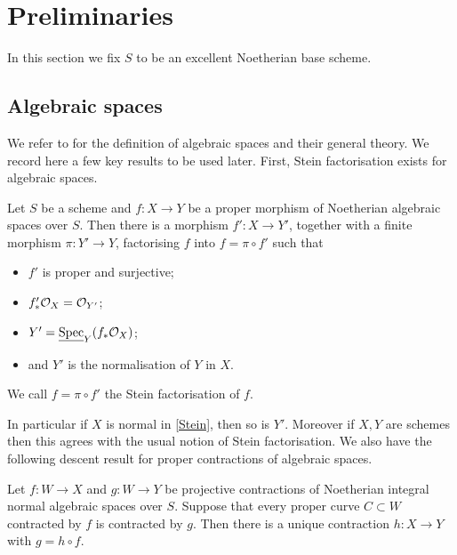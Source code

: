 	\section{Preliminaries}
	In this section we fix $S$ to be an excellent Noetherian base scheme.
	\subsection{Algebraic spaces}
	
	We refer to  for the definition of algebraic spaces and their general theory. We record here a few key results to be used later. First, Stein factorisation exists for algebraic spaces. 
	
	\begin{theorem}\label{Stein}
		Let $S$ be a scheme and $f \colon X \to Y$ be a proper morphism of Noetherian algebraic spaces over $S$. 
		Then there is a morphism $f' \colon X \to Y'$, together with a finite morphism $\pi \colon Y' \to Y$, factorising $f$ into $f=\pi \circ f'$  such that
		\begin{itemize}
			\item $f'$ is proper and surjective;
			\item $f'_{*}\ox = \ox[Y']$;
			\item $Y'=\underline{\textup{Spec}}_{Y}(f_{*}\ox)$;
			\item and $Y'$ is the normalisation of $Y$ in $X$.
		\end{itemize}
		We call $f=\pi\circ f'$ the Stein factorisation of $f$.
	\end{theorem}
	
	In particular if $X$ is normal in \autoref{Stein}, then so is $Y'$. Moreover if $X,Y$ are schemes then this agrees with the usual notion of Stein factorisation.
	We also have the following descent result for proper contractions of algebraic spaces.
	
	\begin{lemma}\label{as-ext}
		Let $f \colon W \to X$ and $g \colon W \to Y$ be projective contractions of Noetherian integral normal algebraic spaces over $S$. 
		Suppose that every proper curve $C \subset W$ contracted by $f$ is contracted by $g$. 
		Then there is a unique contraction $h\colon X \to Y$ with $g=h \circ f$.
	\end{lemma}
	
